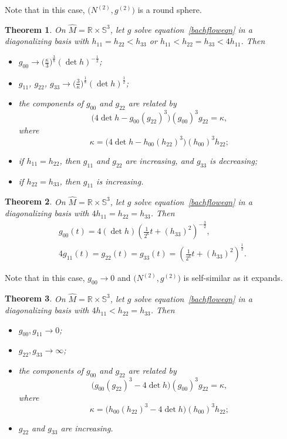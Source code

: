 \documentclass[10pt,a4paper]{amsart}
\numberwithin{equation}{section}
\newtheorem{Theorem}{Theorem}[section]
\begin{document}
Note that in this case, $\big(N^{(2)}, g^{(2)}\big)$ is a round sphere.

\begin{Theorem} \label{s3bdythm2} On $\widehat{M} = \mathbb{R} \times \mathbb{S}^3$, let $g$ solve equation~\eqref{bachfloweqn} in a diagonalizing basis with $h_{11} = h_{22} < h_{33}$ or $h_{11} < h_{22} = h_{33} < 4 h_{11}$. Then
\begin{itemize}\itemsep=0pt
\item $g_{00} \rightarrow \big(\frac{\kappa}{3} \big)^{\frac{3}{8}} (\det h)^{-\frac{1}{2}}$;
\item $g_{11}$, $g_{22}$, $g_{33} \rightarrow \big(\frac{3}{\kappa} \big)^{\frac{1}{8}} (\det h)^{\frac{1}{2}}$;
\item the components of $g_{00}$ and $g_{22}$ are related by
\[
\big(4 \det h - g_{00} (g_{22})^3\big) (g_{00})^3g_{22} = \kappa,
\]
where
\[
\kappa = \big(4 \det h - h_{00} (h_{22})^3\big) (h_{00})^3 h_{22};
\]
\item if $h_{11} = h_{22}$, then $g_{11}$ and $g_{22}$ are increasing, and $g_{33}$ is decreasing;
\item if $h_{22} = h_{33}$, then $g_{11}$ is increasing.
\end{itemize}
\end{Theorem}

\begin{Theorem} \label{s3bdythm3}
On $\widehat{M} = \mathbb{R} \times \mathbb{S}^3$, let $g$ solve equation~\eqref{bachfloweqn} in a diagonalizing basis with $4h_{11} = h_{22} = h_{33}$. Then
\begin{gather*}
g_{00}(t) = 4 (\det h) \left(\frac{1}{2^6} t + (h_{33})^2\right)^{-\frac{3}{2}}, \\
4 g_{11}(t) = g_{22}(t) = g_{33}(t) = \left(\frac{1}{2^6} t + (h_{33})^2 \right)^{\frac{1}{2}}.
\end{gather*}
\end{Theorem}

Note that in this case, $g_{00} \rightarrow 0$ and $\big(N^{(2)}, g^{(2)}\big)$ is self-similar as it expands.

\begin{Theorem} \label{s3bdythm4}
On $\widehat{M} = \mathbb{R} \times \mathbb{S}^3$, let $g$ solve equation~\eqref{bachfloweqn} in a diagonalizing basis with $4h_{11} < h_{22} = h_{33}$. Then
\begin{itemize}\itemsep=0pt
\item $g_{00}, g_{11} \rightarrow 0$;
\item $g_{22}, g_{33} \rightarrow \infty$;
\item the components of $g_{00}$ and $g_{22}$ are related by
\[
\big(g_{00} (g_{22})^3 - 4 \det h\big) (g_{00})^3 g_{22} = \kappa,
\]
where
\[
\kappa = \big(h_{00} (h_{22})^3 - 4 \det h\big) (h_{00})^3 h_{22};
\]
\item $g_{22}$ and $g_{33}$ are increasing.
\end{itemize}
\end{Theorem}
\end{document}
